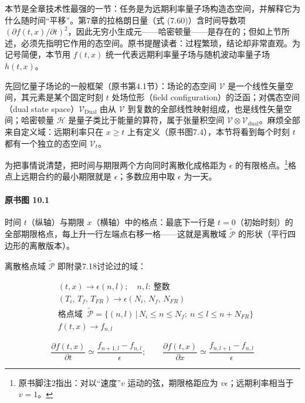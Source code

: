 本节是全章技术性最强的一节：任务是为远期利率量子场构造态空间，并解释它为什么随时间“平移”。第7章的拉格朗日量（式 (7.60)）含时间导数项 $(\partial f(t,x)/\partial t)^2$，因此无穷小生成元——哈密顿量——是存在的；但如上节所述，必须先指明它作用的态空间。原书提醒读者：过程繁琐，结论却非常直观。为记号简便，本节用 $f(t,x)$ 统一代表远期利率量子场与随机波动率量子场 $h(t,x)$。

先回忆量子场论的一般框架（原书第4.1节）：场论的态空间 $\mathcal{V}$ 是一个线性矢量空间，其元素是某个固定时刻 $t$ 处场位形（field configuration）的泛函；对偶态空间（dual state space）$\mathcal{V}_{\text{Dual}}$ 由从 $\mathcal{V}$ 到复数的全部线性映射组成，也是线性矢量空间；哈密顿量 $\mathcal{H}$ 是量子类比于能量的算符，属于张量积空间 $\mathcal{V}\otimes\mathcal{V}_{\text{dual}}$。麻烦全部来自定义域：远期利率只在 $x\ge t$ 上有定义（原书图7.4），本节将看到每个时刻 $t$ 都有一个独立的态空间 $\mathcal{V}_t$。

为把事情说清楚，把时间与期限两个方向同时离散化成格距为 $\epsilon$ 的有限格点。\footnote{原书脚注2指出：对以“速度”$v$ 运动的弦，期限格距应为 $v\epsilon$；远期利率相当于 $v=1$。}格点上远期合约的最小期限就是 $\epsilon$；多数应用中取 $\epsilon$ 为一天。

\paragraph{原书图 10.1}\quad 时间 $t$（纵轴）与期限 $x$（横轴）中的格点：最底下一行是 $t=0$（初始时刻）的全部期限格点，每上升一行左端点右移一格——这就是离散域 $\widetilde{\mathcal{P}}$ 的形状（平行四边形的离散版本）。

离散格点域 $\widetilde{\mathcal{P}}$ 即附录7.18讨论过的域：

\begin{equation*}
\begin{aligned}
&(t,x)\to\epsilon(n,l);\quad n,l:\ \text{整数}\\
&(T_i,\,T_f,\,T_{FR})\to\epsilon(N_i,\,N_f,\,N_{FR})\\
&\text{格点域 }\ \widetilde{\mathcal{P}}=\{(n,l)\,|\,N_i\le n\le N_f;\ n\le l\le n+N_{FR}\}\\
&f(t,x)\to f_{n,l}
\end{aligned}
\tag{10.2}
\end{equation*}

\begin{equation*}
\frac{\partial f(t,x)}{\partial t}\simeq\frac{f_{n+1,l}-f_{n,l}}{\epsilon};\qquad
\frac{\partial f(t,x)}{\partial x}\simeq\frac{f_{n,l+1}-f_{n,l}}{\epsilon}
\tag{10.3}
\end{equation*}

